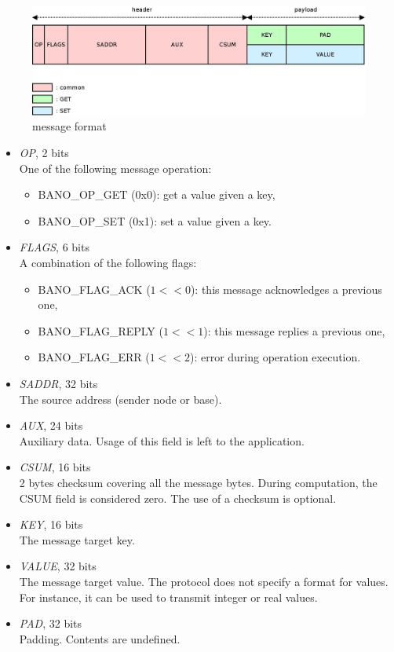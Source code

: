 \documentclass[a4paper, 11pt]{article}
\begin{document}
\paragraph{}
\begin{figure}[!h]
\begin{center}
\includegraphics[scale=0.2]{../dia/msg_format/main.jpeg}
\end{center}
\caption{\tiny{message format}}
\label{msg_format}
\end{figure}

\begin{itemize}
\item \textit{OP}, 2 bits\\
One of the following message operation:
\begin{itemize}
\item BANO\_OP\_GET (0x0): get a value given a key,
\item BANO\_OP\_SET (0x1): set a value given a key.
\end{itemize}
\item \textit{FLAGS}, 6 bits\\
A combination of the following flags:
\begin{itemize}
\item BANO\_FLAG\_ACK ($1<<0$): this message acknowledges a previous one,
\item BANO\_FLAG\_REPLY ($1<<1$): this message replies a previous one,
\item BANO\_FLAG\_ERR ($1<<2$): error during operation execution.
\end{itemize}
\item \textit{SADDR}, 32 bits\\
The source address (sender node or base).
\item \textit{AUX}, 24 bits\\
Auxiliary data. Usage of this field is left to the application.
\item \textit{CSUM}, 16 bits\\
2 bytes checksum covering all the message bytes. During computation,
the CSUM field is considered zero. The use of a checksum is optional.
\item \textit{KEY}, 16 bits\\
The message target key.
\item \textit{VALUE}, 32 bits\\
The message target value. The protocol does not specify a format for
values. For instance, it can be used to transmit integer or real values.
\item \textit{PAD}, 32 bits\\
Padding. Contents are undefined.
\end{itemize}
\end{document}
